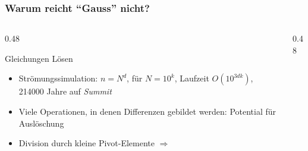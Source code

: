 %
%
%
\begin{frame}
\frametitle{Warum reicht ``Gauss'' nicht?}
\begin{columns}[t]
\begin{column}{0.48\hsize}
\begin{block}{Gleichungen Lösen}
\begin{itemize}
\item<4->
Strömungssimulation: $n=N^d$, für $N=10^k$,
Laufzeit $O(10^{3dk})$, 214000 Jahre auf {\em Summit}
\item<5->
Viele Operationen, in denen Differenzen gebildet werden: Potential für Auslöschung
\item<6->
Division durch kleine Pivot-Elemente $\Rightarrow$ 
\end{itemize}
\end{block}
\end{column}
\begin{column}{0.48\hsize}
\end{column}
\end{columns}
\end{frame}
